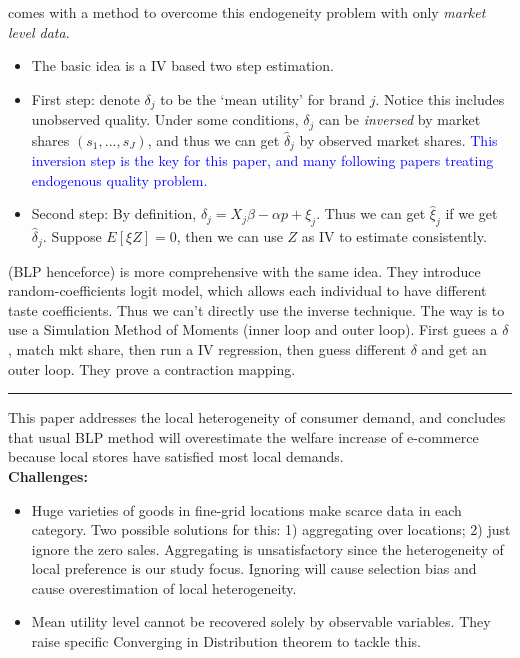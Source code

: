 \documentclass{book}
\theoremstyle{plain}
\theoremstyle{definition}
\newcommand{\myline}{\vspace{3mm} \hrule \vspace{4mm}}
\begin{document}
\cite{Berry:1994jh} comes with a method to overcome this endogeneity problem with only \textit{market level data}.
\begin{itemize}
	\setlength{\itemsep}{0pt}
	\item The basic idea is a IV based two step estimation.
	\item First step: denote $\delta_j$ to be the `mean utility' for brand $j$. Notice this includes unobserved quality. Under some conditions, $\delta_j$ can be \textit{inversed} by market shares $(s_1,...,s_J)$, and thus we can get $\hat \delta_j$ by observed market shares. 
	\textcolor{blue}{This inversion step is the key for this paper, and many following papers treating endogenous quality problem.}
	\item Second step: By definition, $\delta_j=X_j\beta -\alpha p +\xi_j$. Thus we can get $\hat \xi_j$ if we get $\hat \delta_j$. Suppose $E[\xi Z]=0$, then we can use $Z$ as IV to estimate consistently.
\end{itemize}

\cite{berry.et.al.1995.emca} (BLP henceforce) is more comprehensive with the same idea. They introduce random-coefficients logit model, which allows each individual to have different taste coefficients. Thus we can't directly use the inverse technique. The way is to use a Simulation Method of Moments (inner loop and outer loop). First guees a $\delta$, match mkt share, then run a IV regression, then guess different $\delta$ and get an outer loop. They prove a contraction mapping.

\myline

\textbf{}

This paper addresses the local heterogeneity of consumer demand,
and concludes that usual BLP method will overestimate the welfare increase of e-commerce because local stores have satisfied most local demands.\\

\noindent
\textbf{Challenges:}
\begin{itemize}
	\item Huge varieties of goods in fine-grid locations make scarce data in each category. Two possible solutions for this: 1) aggregating over locations; 2) just ignore the zero sales. 
	Aggregating is unsatisfactory since the heterogeneity of local preference is our study focus.
	Ignoring will cause selection bias and cause overestimation of local heterogeneity.
	\item Mean utility level cannot be recovered solely by observable variables.
	They raise specific Converging in Distribution theorem to tackle this.
\end{itemize}
\end{document}
